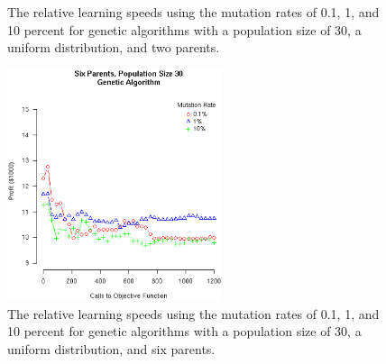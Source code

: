 \documentclass[12pt]{article}
\begin{document}
\begin{figure}[!ht]
\begin{minipage}[b]{0.5\linewidth}
    \caption{The relative learning speeds using the mutation rates of 0.1,
      1, and 10 percent for genetic algorithms with a population size of 30, a
      uniform distribution, and two parents.}
  \end{minipage}
\hspace{0.5cm} %
  \begin{minipage}[b]{0.5\linewidth}
    \center
    \includegraphics[width=6.3cm]{Gen6ParentsPop30.eps}
    \caption{The relative learning speeds using the mutation rates of 0.1,
      1, and 10 percent for genetic algorithms with a population size of 30, a
      uniform distribution, and six parents.}
  \end{minipage}
\end{figure}

\pagebreak
\end{document}
